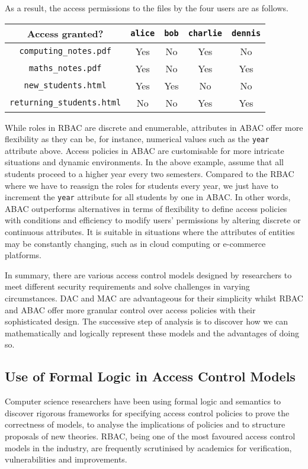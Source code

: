 \documentclass{article}
\begin{document}
As a result, the access permissions to the files by the four users are as follows.

\begin{center}
\begin{tabular}{c|cccc}
    Access granted? & \texttt{alice} & \texttt{bob} & \texttt{charlie} & \texttt{dennis}\\
    \hline
    \texttt{computing\_notes.pdf} & Yes & No & Yes & No\\
    \texttt{maths\_notes.pdf} & Yes & No & Yes & Yes\\
    \texttt{new\_students.html} & Yes & Yes & No & No\\
    \texttt{returning\_students.html} & No & No & Yes & Yes
\end{tabular}
\end{center}

While roles in RBAC are discrete and enumerable, attributes in ABAC offer more flexibility as they can be, for instance, numerical values such as the \texttt{year} attribute above. Access policies in ABAC are customisable for more intricate situations and dynamic environments. In the above example, assume that all students proceed to a higher year every two semesters. Compared to the RBAC where we have to reassign the roles for students every year, we just have to increment the \texttt{year} attribute for all students by one in ABAC. In other words, ABAC outperforms alternatives in terms of flexibility to define access policies with conditions and efficiency to modify users' permissions by altering discrete or continuous attributes. It is suitable in situations where the attributes of entities may be constantly changing, such as in cloud computing or e-commerce platforms.

In summary, there are various access control models designed by researchers to meet different security requirements and solve challenges in varying circumstances. DAC and MAC are advantageous for their simplicity whilst RBAC and ABAC offer more granular control over access policies with their sophisticated design. The successive step of analysis is to discover how we can mathematically and logically represent these models and the advantages of doing so.

\subsection{Use of Formal Logic in Access Control Models}

Computer science researchers have been using formal logic and semantics to discover rigorous frameworks for specifying access control policies to prove the correctness of models, to analyse the implications of policies and to structure proposals of new theories. RBAC, being one of the most favoured access control models in the industry, are frequently scrutinised by academics for verification, vulnerabilities and improvements.
\end{document}

